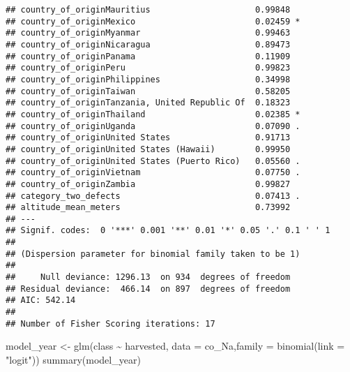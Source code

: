\documentclass[
]{article}
\newenvironment{Shaded}{\begin{snugshade}}{\end{snugshade}}
\newcommand{\AttributeTok}[1]{\textcolor[rgb]{0.77,0.63,0.00}{#1}}
\newcommand{\FunctionTok}[1]{\textcolor[rgb]{0.00,0.00,0.00}{#1}}
\newcommand{\NormalTok}[1]{#1}
\newcommand{\OtherTok}[1]{\textcolor[rgb]{0.56,0.35,0.01}{#1}}
\newcommand{\SpecialCharTok}[1]{\textcolor[rgb]{0.00,0.00,0.00}{#1}}
\newcommand{\StringTok}[1]{\textcolor[rgb]{0.31,0.60,0.02}{#1}}
\begin{document}
\begin{verbatim}
## country_of_originMauritius                     0.99848    
## country_of_originMexico                        0.02459 *  
## country_of_originMyanmar                       0.99463    
## country_of_originNicaragua                     0.89473    
## country_of_originPanama                        0.11909    
## country_of_originPeru                          0.99823    
## country_of_originPhilippines                   0.34998    
## country_of_originTaiwan                        0.58205    
## country_of_originTanzania, United Republic Of  0.18323    
## country_of_originThailand                      0.02385 *  
## country_of_originUganda                        0.07090 .  
## country_of_originUnited States                 0.91713    
## country_of_originUnited States (Hawaii)        0.99950    
## country_of_originUnited States (Puerto Rico)   0.05560 .  
## country_of_originVietnam                       0.07750 .  
## country_of_originZambia                        0.99827    
## category_two_defects                           0.07413 .  
## altitude_mean_meters                           0.73992    
## ---
## Signif. codes:  0 '***' 0.001 '**' 0.01 '*' 0.05 '.' 0.1 ' ' 1
## 
## (Dispersion parameter for binomial family taken to be 1)
## 
##     Null deviance: 1296.13  on 934  degrees of freedom
## Residual deviance:  466.14  on 897  degrees of freedom
## AIC: 542.14
## 
## Number of Fisher Scoring iterations: 17
\end{verbatim}

\begin{Shaded}
\begin{Highlighting}[]
\NormalTok{model\_year }\OtherTok{\textless{}{-}} \FunctionTok{glm}\NormalTok{(class }\SpecialCharTok{\textasciitilde{}}\NormalTok{ harvested, }\AttributeTok{data =}\NormalTok{ co\_Na,}\AttributeTok{family =} \FunctionTok{binomial}\NormalTok{(}\AttributeTok{link =} \StringTok{"logit"}\NormalTok{))}
\FunctionTok{summary}\NormalTok{(model\_year)}
\end{Highlighting}
\end{Shaded}
\end{document}
